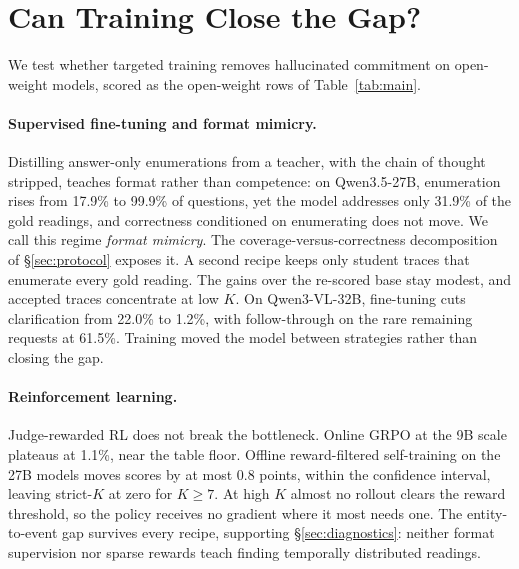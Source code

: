 \section{Can Training Close the Gap?}
\label{sec:mitigation}

We test whether targeted training removes hallucinated commitment on open-weight models, scored as the open-weight rows of Table~\ref{tab:main}.

\paragraph{Supervised fine-tuning and format mimicry.} Distilling answer-only enumerations from a teacher, with the chain of thought stripped, teaches format rather than competence: on Qwen3.5-27B, enumeration rises from 17.9\% to 99.9\% of questions, yet the model addresses only 31.9\% of the gold readings, and correctness conditioned on enumerating does not move. We call this regime \textit{format mimicry}. The coverage-versus-correctness decomposition of \S\ref{sec:protocol} exposes it.
A second recipe keeps only student traces that enumerate every gold reading. The gains over the re-scored base stay modest, and accepted traces concentrate at low $K$. On Qwen3-VL-32B, fine-tuning cuts clarification from 22.0\% to 1.2\%, with follow-through on the rare remaining requests at 61.5\%. Training moved the model between strategies rather than closing the gap.

\paragraph{Reinforcement learning.} Judge-rewarded RL does not break the bottleneck. Online GRPO at the 9B scale plateaus at 1.1\%, near the table floor. Offline reward-filtered self-training on the 27B models moves scores by at most 0.8 points, within the confidence interval, leaving strict-$K$ at zero for $K \geq 7$. At high $K$ almost no rollout clears the reward threshold, so the policy receives no gradient where it most needs one. The entity-to-event gap survives every recipe, supporting \S\ref{sec:diagnostics}: neither format supervision nor sparse rewards teach finding temporally distributed readings.
